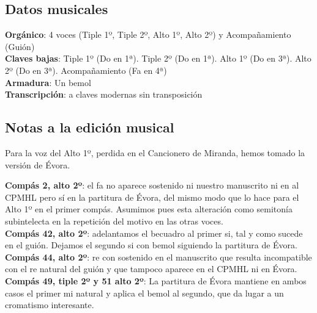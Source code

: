 \subsection*{Datos musicales}
\noindent \textbf{Orgánico}: 4 voces (Tiple 1º, Tiple 2º, Alto 1º, Alto 2º) y Acompañamiento (Guión)\\
\textbf{Claves bajas}: Tiple 1º (Do en 1ª). Tiple 2º (Do en 1ª). Alto 1º (Do en 3ª). Alto 2º (Do en 3ª). Acompañamiento (Fa en 4ª)\\
\textbf{Armadura}: Un bemol\\
\textbf{Transcripción}: a claves modernas sin transposición

\subsection*{Notas a la edición musical}
Para la voz del Alto 1º, perdida en el Cancionero de Miranda, hemos tomado la versión de Évora.

\noindent \textbf{Compás 2, alto 2º}: el fa no aparece sostenido ni nuestro manuscrito ni en al CPMHL pero sí en la partitura de Évora, del mismo modo que lo hace para el Alto 1º en el primer compás. Asumimos pues esta alteración como semitonía subintelecta en la repetición del motivo en las otras voces.\\
\textbf{Compás 42, alto 2º}: adelantamos el becuadro al primer si, tal y como sucede en el guión. Dejamos el segundo si con bemol siguiendo la partitura de Évora.\\
\textbf{Compás 44, alto 2º}: re con sostenido en el manuscrito que resulta incompatible con el re natural del guión y que tampoco aparece en el CPMHL ni en Évora.\\
\textbf{Compás 49, tiple 2º y 51 alto 2º}: La partitura de Évora mantiene en ambos casos el primer mi natural y aplica el bemol al segundo, que da lugar a un cromatismo interesante.


